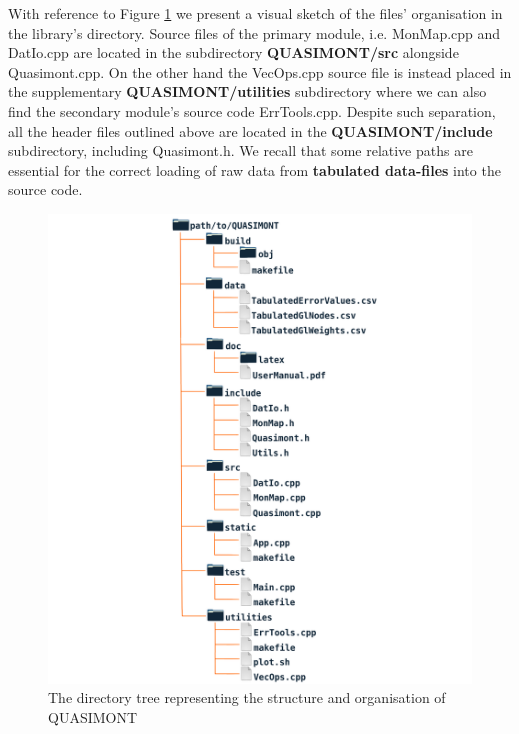\documentclass[a4paper, twosided]{book}
\begin{document}
\noindent
With reference to Figure \ref{Fig2.1} we present a visual sketch of the files' organisation in the library's directory. Source files of the primary module, i.e. \colorbox{poliGrayBlue}{MonMap.cpp} and \colorbox{poliGrayBlue}{DatIo.cpp} are located in the subdirectory \colorbox{poliGrayBlue}{\textbf{QUASIMONT/src}} alongside \colorbox{poliGrayBlue}{Quasimont.cpp}. On the other hand the \colorbox{poliGrayBlue}{VecOps.cpp} source file is instead placed in the supplementary \colorbox{poliGrayBlue}{\textbf{QUASIMONT/utilities}} subdirectory where we can also find the secondary module's source code \colorbox{poliGrayBlue}{ErrTools.cpp}. Despite such separation, all the header files outlined above are located in the \colorbox{poliGrayBlue}{\textbf{QUASIMONT/include}} subdirectory, including \colorbox{poliGrayBlue}{Quasimont.h}. We recall that some relative paths are essential for the correct loading of raw data from \color{poliDarkBlue} \textbf{tabulated data-files} \color{black} into the source code.

\begin{center}
        \begin{figure}[H]
        \centering
        \includegraphics[keepaspectratio, width=.6\textwidth]{images/DirectoryStructureCentered.png}
        \caption{The directory tree representing the structure and organisation of QUASIMONT}
        \label{Fig2.1}
        \end{figure}
\end{center}
\end{document}

